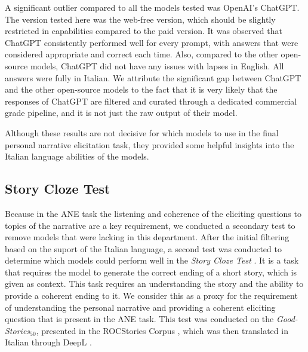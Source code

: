 A significant outlier compared to all the models tested was OpenAI's ChatGPT. The version tested here was the web-free version, which should be slightly restricted in capabilities compared to the paid version. It was observed that ChatGPT consistently performed well for every prompt, with answers that were considered appropriate and correct each time. Also, compared to the other open-source models, ChatGPT did not have any issues with lapses in English. All answers were fully in Italian. We attribute the significant gap between ChatGPT and the other open-source models to the fact that it is very likely that the responses of ChatGPT are filtered and curated through a dedicated commercial grade pipeline, and it is not just the raw output of their model.

Although these results are not decisive for which models to use in the final personal narrative elicitation task, they provided some helpful insights into the Italian language abilities of the models.

\subsection{Story Cloze Test}
Because in the ANE task the listening and coherence of the eliciting questions to topics of the narrative are a key requirement, we conducted a secondary test to remove models that were lacking in this department. After the initial filtering based on the suport of the Italian language, a second test was conducted to determine which models could perform well in the \emph{Story Cloze Test} \cite{mostafazadeh2016corpus}. It is a task that requires the model to generate the correct ending of a short story, which is given as context. This task requires an understanding the story and the ability to provide a coherent ending to it. We consider this as a proxy for the requirement of understanding the personal narrative and providing a coherent eliciting question that is present in the ANE task. This test was conducted on the \emph{Good-Stories$_{50}$}, presented in the ROCStories Corpus \cite{mostafazadeh2016corpus}, which was then translated in Italian through DeepL \cite{deepl}.

